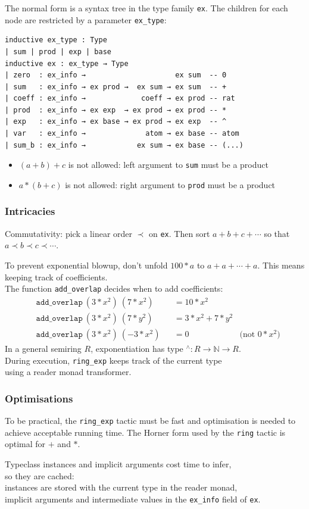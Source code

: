 \documentclass{beamer}
\newcommand{\N}{\mathbb{N}}
\newcommand{\lean}[1]{\texttt{#1}\xspace} %
\newcommand{\pow}{{\ensuremath{{}^\wedge}}\xspace}
\newcommand{\ring}{\lean{ring}}
\newcommand{\ringexp}{\lean{ring\_exp}}
\begin{document}
\begin{frame}[fragile]
	The normal form is a syntax tree in the type family \lean{ex}.
	The children for each node are restricted by a parameter \lean{ex\_type}:

\begin{lstlisting}
inductive ex_type : Type
| sum | prod | exp | base
inductive ex : ex_type → Type
| zero  : ex_info →                     ex sum  -- 0
| sum   : ex_info → ex prod →  ex sum → ex sum  -- +
| coeff : ex_info →             coeff → ex prod -- rat
| prod  : ex_info → ex exp  → ex prod → ex prod -- *
| exp   : ex_info → ex base → ex prod → ex exp  -- ^
| var   : ex_info →              atom → ex base -- atom
| sum_b : ex_info →            ex sum → ex base -- (...)
\end{lstlisting}

	\begin{itemize}
		\item $(a + b) + c$ is not allowed: left argument to \lean{sum} must be a product
		\item $a * (b + c)$ is not allowed: right argument to \lean{prod} must be a product
	\end{itemize}
\end{frame}

\begin{frame} \frametitle{Intricacies}
Commutativity: pick a linear order $\prec$ on \lean{ex}.
Then sort $a + b + c + \cdots$ so that $a \prec b \prec c \prec \cdots$.

\pause
To prevent exponential blowup, don't unfold $100 * a$ to $a + a + \cdots + a$.
This means keeping track of coefficients.\\[\jot]
The function \lean{add\_overlap} decides when to add coefficients:
\begin{align*}
	&\lean{add\_overlap}\ (3 * x^2)\ (7 * x^2) &&= 10 * x^2 \\
	&\lean{add\_overlap}\ (3 * x^2)\ (7 * y^2) &&= 3 * x^2 + 7 * y^2 \\
	&\lean{add\_overlap}\ (3 * x^2)\ (-3 * x^2) &&= 0 &\text{(not $0 * x^2$)}
\end{align*}
\pause
In a general semiring $R$, exponentiation has type $\pow : R \to \N \to R$.\\
During execution, \ringexp keeps track of the current type\\
using a reader monad transformer.
\end{frame}

\begin{frame} \frametitle{Optimisations}
To be practical, the \ringexp tactic must be fast and
optimisation is needed to achieve acceptable running time.
The Horner form used by the \ring tactic is optimal for $+$ and $*$.

\pause
Typeclass instances and implicit arguments cost time to infer,\\
so they are cached:\\
instances are stored with the current type in the reader monad,\\
implicit arguments and intermediate values in the \lean{ex\_info} field of \lean{ex}.
\end{frame}
\end{document}
